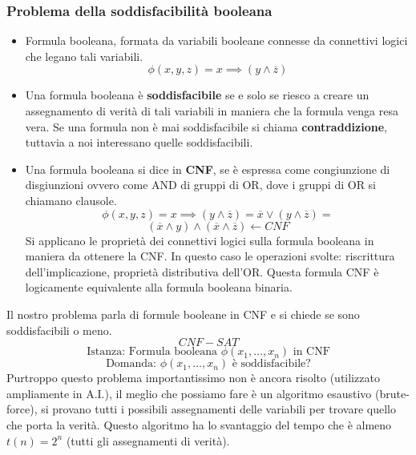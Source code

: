 \documentclass{article}
\begin{document}
\subsubsection{Problema della soddisfacibilità booleana}
\begin{itemize}
    \item Formula booleana, formata da variabili booleane connesse da connettivi logici che legano
          tali variabili.
          $$\phi(x,y,z)=x\implies(y\land \overline{z})$$
    \item Una formula booleana è \textbf{soddisfacibile} se e solo se riesco a creare un assegnamento
          di verità di tali variabili in maniera che la formula venga resa vera. Se una formula non è
          mai soddisfacibile si chiama \textbf{contraddizione}, tuttavia a noi interessano quelle
          soddisfacibili.
    \item Una formula booleana si dice in \textbf{CNF}, se è espressa come congiunzione di disgiunzioni
          ovvero come AND di gruppi di OR, dove i gruppi di OR si chiamano clausole.
          $$\phi(x,y,z)=x\implies(y\land\overline{z})=\overline{x}\lor (y\land\overline{z})=$$
          $$(\overline{x}\land y)\land(\overline{x}\land\overline{z})\leftarrow CNF$$
          Si applicano le proprietà dei connettivi logici sulla formula booleana in maniera da ottenere
          la CNF. In questo caso le operazioni svolte: riscrittura dell'implicazione, proprietà distributiva
          dell'OR. Questa formula CNF è logicamente equivalente alla formula booleana binaria.
\end{itemize}
Il nostro problema parla di formule booleane in CNF e si chiede se sono soddisfacibili o meno.
$$CNF-SAT$$
$$\text{Istanza: Formula booleana }\phi (x_1,\dots,x_n)\text{ in CNF}$$
$$\text{Domanda: }\phi (x_1,\dots,x_n)\text{ è soddisfacibile?}$$
Purtroppo questo problema importantissimo non è ancora risolto (utilizzato ampliamente in A.I.),
il meglio che possiamo fare è un algoritmo esaustivo (brute-force), si provano tutti i possibili
assegnamenti delle variabili per trovare quello che porta la verità. Questo algoritmo ha lo svantaggio
del tempo che è almeno $t(n)=2^n$ (tutti gli assegnamenti di verità).
\end{document}
